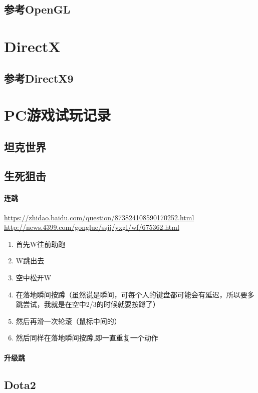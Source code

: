 \documentclass[UTF8,a4paper,8pt]{ctexart}
\begin{document}
	\subsection{参考OpenGL}
	
\newpage
\section{DirectX}
	\subsection{参考DirectX9}
	
\newpage
\section{PC游戏试玩记录}
	\subsection{坦克世界}
	
	\subsection{生死狙击}
		\paragraph{连跳}
			\url{https://zhidao.baidu.com/question/873824108590170252.html}
			\url{http://news.4399.com/gonglue/ssjj/yxgl/wf/675362.html}
			\begin{enumerate}
				\item 首先W往前助跑
				\item W跳出去
				\item 空中松开W
				\item 在落地瞬间按蹲（虽然说是瞬间，可每个人的键盘都可能会有延迟，所以要多跳尝试，我就是在空中2/3的时候就要按蹲了）
				\item 然后再滑一次轮滚（鼠标中间的）
				\item 然后同样在落地瞬间按蹲,即一直重复一个动作
			\end{enumerate}

		\paragraph{升级跳}
	
	\subsection{Dota2}
\end{document}

